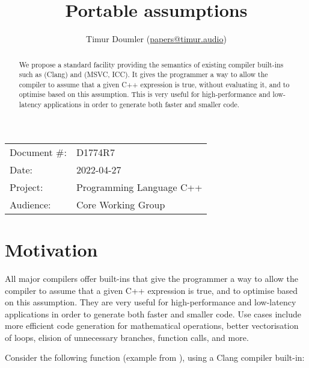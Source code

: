 

\newcommand{\forceindent}{\parindent=1em\indent\parindent=0pt\relax} %


\title{Portable assumptions}
\author{
  Timur Doumler \small(\href{mailto:papers@timur.audio}{papers@timur.audio})
}
\date{}
\maketitle

\begin{tabular}{ll}
Document \#: & D1774R7 \\
Date: & 2022-04-27\\
Project: & Programming Language C++ \\
Audience: & Core Working Group
\end{tabular}


\begin{abstract}
We propose a standard facility providing the semantics of existing compiler built-ins such as  (Clang) and  (MSVC, ICC). It gives the programmer a way to allow the compiler to assume that a given C++ expression is true, without evaluating it, and to optimise based on this assumption. This is very useful for high-performance and low-latency applications in order to generate both faster and smaller code.
\end{abstract}

\vspace{5mm}

\section{Motivation}
\label{sec:motivation}

All major compilers offer built-ins that give the programmer a way to allow the compiler to assume that a given C++ expression is true, and to optimise based on this assumption. They are very useful for high-performance and low-latency applications in order to generate both faster and smaller code. Use cases include more efficient code generation for mathematical operations, better vectorisation of loops, elision of unnecessary branches, function calls, and more.

Consider the following function (example from \cite{Regehr2014}), using a Clang compiler built-in:

